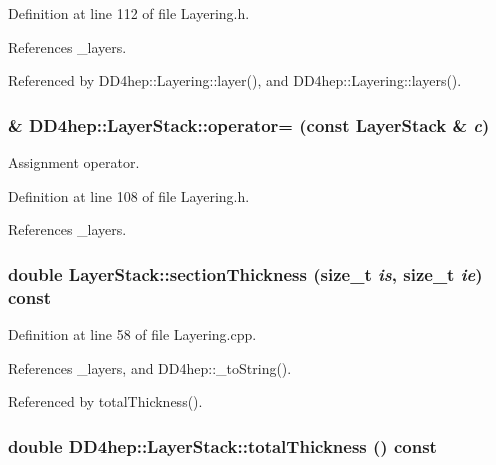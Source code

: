 Definition at line 112 of file Layering.h.

References \_\-layers.

Referenced by DD4hep::Layering::layer(), and DD4hep::Layering::layers().\hypertarget{class_d_d4hep_1_1_layer_stack_ae660afcfb9b79db69cc225dc5d748216}{
\subsubsection[{operator=}]{\& DD4hep::LayerStack::operator= (const {\bf LayerStack} \& {\em c})}}
\label{class_d_d4hep_1_1_layer_stack_ae660afcfb9b79db69cc225dc5d748216}


Assignment operator. 

Definition at line 108 of file Layering.h.

References \_\-layers.\hypertarget{class_d_d4hep_1_1_layer_stack_af47ac0d3a243e46d40e4e52792394489}{
\subsubsection[{sectionThickness}]{\setlength{\rightskip}{0pt plus 5cm}double LayerStack::sectionThickness (size\_\-t {\em is}, \/  size\_\-t {\em ie}) const}}
\label{class_d_d4hep_1_1_layer_stack_af47ac0d3a243e46d40e4e52792394489}


Definition at line 58 of file Layering.cpp.

References \_\-layers, and DD4hep::\_\-toString().

Referenced by totalThickness().\hypertarget{class_d_d4hep_1_1_layer_stack_af99b4e02da1c3ae6f31d63eb27e9fce7}{
\subsubsection[{totalThickness}]{\setlength{\rightskip}{0pt plus 5cm}double DD4hep::LayerStack::totalThickness () const}}
\label{class_d_d4hep_1_1_layer_stack_af99b4e02da1c3ae6f31d63eb27e9fce7}


